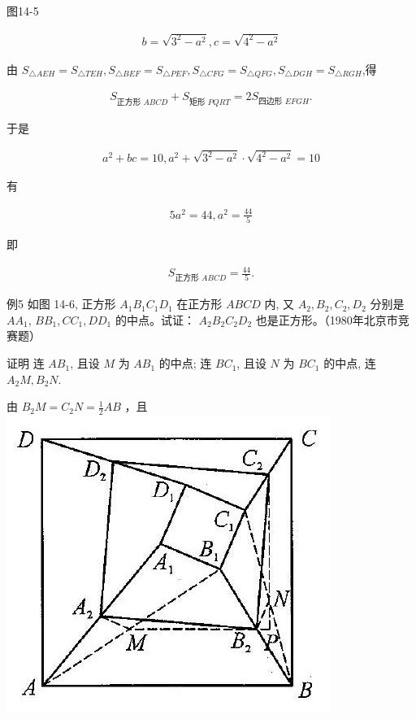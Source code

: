 \documentclass[10pt]{article}
\begin{document}
图14-5

\begin{align*}
b=\sqrt{3^{2}-a^{2}}, c=\sqrt{4^{2}-a^{2}}
\end{align*}

由 $S_{\triangle A E H}=S_{\triangle T E H}, S_{\triangle B E F}=S_{\triangle P E F}, S_{\triangle C F G}=S_{\triangle Q F G}, S_{\triangle D G H}=S_{\triangle R G H}$,得

\begin{align*}
S_{\text {正方形 } A B C D}+S_{\text {矩形 } P Q R T}=2 S_{\text {四边形 } E F G H} .
\end{align*}

于是

\begin{align*}
a^{2}+b c=10, a^{2}+\sqrt{3^{2}-a^{2}} \cdot \sqrt{4^{2}-a^{2}}=10
\end{align*}

有

\begin{align*}
5 a^{2}=44, a^{2}=\frac{44}{5}
\end{align*}

即

\begin{align*}
S_{\text {正方形 } A B C D}=\frac{44}{5} .
\end{align*}

例5 如图 14-6, 正方形 $A_{1} B_{1} C_{1} D_{1}$ 在正方形 $A B C D$ 内, 又 $A_{2}, B_{2}, C_{2}, D_{2}$ 分别是 $A A_{1}$, $B B_{1}, C C_{1}, D D_{1}$ 的中点。试证： $A_{2} B_{2} C_{2} D_{2}$ 也是正方形。（1980年北京市竞赛题）

证明 连 $A B_{1}$, 且设 $M$ 为 $A B_{1}$ 的中点; 连 $B C_{1}$, 且设 $N$ 为 $B C_{1}$ 的中点, 连 $A_{2} M, B_{2} N$.

由 $B_{2} M=C_{2} N=\frac{1}{2} A B$ ，且\\
\includegraphics[max width=\textwidth, center]{2024_10_30_2c8f45efd4a519b08e1ag-130(1)}
\end{document}
